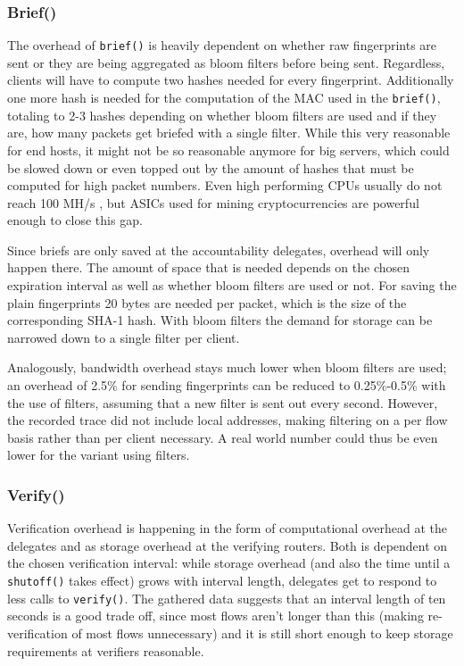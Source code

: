 \documentclass{acm_proc_article-sp}
\begin{document}
\subsubsection{Brief()}
The overhead of \texttt{brief()} is heavily dependent on whether raw fingerprints are sent or they are being aggregated as bloom filters before being sent. Regardless, clients will have to compute two hashes needed for every fingerprint. Additionally one more hash is needed for the computation of the MAC used in the \texttt{brief()}, totaling to 2-3 hashes depending on whether bloom filters are used and if they are, how many packets get briefed with a single filter. While this very reasonable for end hosts, it might not be so reasonable anymore for big servers, which could be slowed down or even topped out by the amount of hashes that must be computed for high packet numbers. Even high performing CPUs usually do not reach 100 MH/s \cite{hashes}, but ASICs used for mining cryptocurrencies are powerful enough to close this gap.

Since briefs are only saved at the accountability delegates, overhead will only happen there. The amount of space that is needed depends on the chosen expiration interval as well as whether bloom filters are used or not. For saving the plain fingerprints 20 bytes are needed per packet, which is the size of the corresponding SHA-1 hash. With bloom filters the demand for storage can be narrowed down to a single filter per client.

Analogously, bandwidth overhead stays much lower when bloom filters are used; an overhead of 2.5\% for sending fingerprints can be reduced to 0.25\%-0.5\% with the use of filters, assuming that a new filter is sent out every second. However, the recorded trace did not include local addresses, making filtering on a per flow basis rather than per client necessary. A real world number could thus be even lower for the variant using filters.

\subsubsection{Verify()}
Verification overhead is happening in the form of computational overhead at the delegates and as storage overhead at the verifying routers. Both is dependent on the chosen verification interval: while storage overhead (and also the time until a \texttt{shutoff()} takes effect) grows with interval length, delegates get to respond to less calls to \texttt{verify()}. The gathered data suggests that an interval length of ten seconds is a good trade off, since most flows aren't longer than this (making re-verification of most flows unnecessary) and it is still short enough to keep storage requirements at verifiers reasonable.
\end{document}
